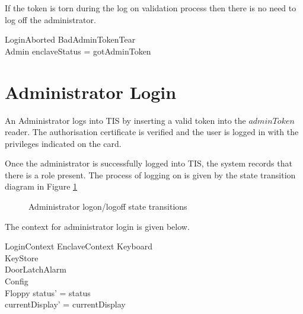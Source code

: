 If the token is torn during the log on validation process then there
is no need to log off the administrator.

\begin{schema}{LoginAborted}
        BadAdminTokenTear
\\      \Xi Admin
\where
        enclaveStatus = gotAdminToken
\end{schema}


\section{Administrator Login}


An Administrator logs into TIS by inserting a valid token
into the $adminToken$ reader. The authorisation certificate is
verified and the user is logged in with the privileges indicated on
the card.

Once the administrator is successfully logged into TIS, the system
records that there is a role present. The process of logging on is
given by the state transition diagram in Figure \ref{fig:logon}

\begin{figure}[htbp]
  \begin{center}
    \leavevmode
    \caption{Administrator logon/logoff state transitions}
    \label{fig:logon}
  \end{center}
\end{figure}

The context for administrator login is given below.

\begin{schema}{LoginContext}
        EnclaveContext
\also
        \Xi Keyboard
\\      \Xi KeyStore
\\      \Xi DoorLatchAlarm
\\      \Xi Config
\\      \Xi Floppy
\where
        status' = status
\\      currentDisplay' = currentDisplay
\end{schema}

